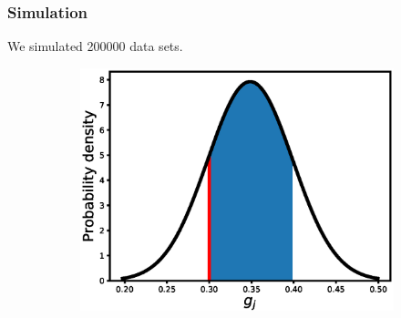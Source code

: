 \documentclass[12pt, table]{article}
\begin{document}
\subsubsection{Simulation}
We simulated 200000 data sets. 
\begin{figure}[H]

   \centering
   \begin{subfigure}[b]{0.45\textwidth}
       \includegraphics[width=1\textwidth, height=0.24\textheight]{figexple1/fgb}
      

\end{subfigure}
\end{figure}
\end{document}
